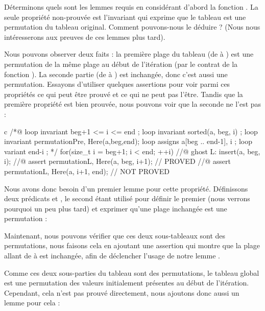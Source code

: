Déterminons quels sont les lemmes requis en considérant d'abord la fonction
. La seule propriété non-prouvée est l'invariant qui
exprime que le tableau est une permutation du tableau original. Comment
pouvons-nous le déduire ? (Nous nous intéresserons aux preuves de ces lemmes
plus tard).



Nous pouvons observer deux faits : la première plage du tableau (de
 à ) est une permutation de la même plage au
début de l'itération (par le contrat de la fonction ). La
seconde partie (de  à ) est inchangée, donc
c'est aussi une permutation. Essayons d'utiliser quelques assertions pour voir
parmi ces propriétés ce qui peut être prouvé et ce qui ne peut pas l'être.
Tandis que la première propriété est bien prouvée, nous pouvons voir que la
seconde ne l'est pas :



\begin{CodeBlock}{c}
  /*@
    loop invariant beg+1 <= i <= end ;
    loop invariant sorted(a, beg, i) ;
    loop invariant permutation{Pre, Here}(a,beg,end);
    loop assigns a[beg .. end-1], i ;
    loop variant end-i ;
  */
  for(size_t i = beg+1; i < end; ++i) {
    //@ ghost L:
    insert(a, beg, i);
    //@ assert permutation{L, Here}(a, beg, i+1); // PROVED
    //@ assert permutation{L, Here}(a, i+1, end); // NOT PROVED
  }
\end{CodeBlock}


Nous avons donc besoin d'un premier lemme pour cette propriété. Définissons
deux prédicats  et , le second
étant utilisé pour définir le premier (nous verrons pourquoi un peu plus
tard) et exprimer qu'une plage inchangée est une permutation :





Maintenant, nous pouvons vérifier que ces deux sous-tableaux sont des
permutations, nous faisons cela en ajoutant une assertion qui montre que la
plage allant de  à  est inchangée, afin de
déclencher l'usage de notre lemme .




Comme ces deux sous-parties du tableau sont des permutations, le tableau
global est une permutation des valeurs initialement présentes au début de
l'itération. Cependant, cela n'est pas prouvé directement, nous ajoutons
donc aussi un lemme pour cela :


